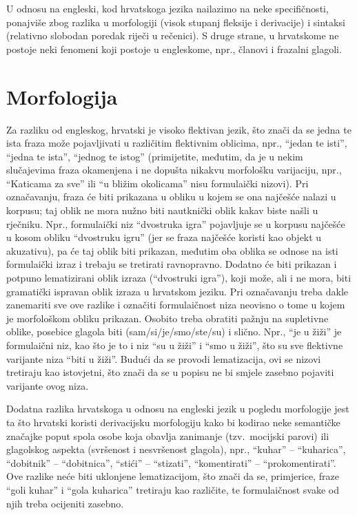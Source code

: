 \documentclass[12pt]{article}
\begin{document}
U odnosu na engleski, kod hrvatskoga jezika nailazimo na neke specifičnosti, ponajviše zbog razlika u
morfologiji (visok stupanj fleksije i derivacije) i sintaksi (relativno slobodan poredak riječi u rečenici). S
druge strane, u hrvatskome ne postoje neki fenomeni koji postoje u engleskome, npr., članovi i frazalni
glagoli.


\section*{Morfologija}

Za razliku od engleskog, hrvatski je visoko flektivan jezik, što znači da se jedna te ista fraza može
pojavljivati u različitim flektivnim oblicima, npr., ``jedan te isti'', ``jedna te ista'', ``jednog te istog'' (primijetite, međutim, da je u nekim slučajevima fraza okamenjena i ne dopušta nikakvu morfološku
varijaciju, npr., ``Katicama za sve'' ili ``u bližim okolicama'' nisu formulaički nizovi). Pri označavanju, fraza će
biti prikazana u obliku u kojem se ona najčešće nalazi u korpusu; taj oblik ne mora nužno biti nautknički
oblik kakav biste našli u rječniku. Npr., formulaički niz ``dvostruka igra'' pojavljuje se u korpusu najčešće u
kosom obliku  ``dvostruku igru''  (jer se fraza najčešće koristi kao objekt u akuzativu), pa će taj oblik biti
prikazan, međutim oba oblika se odnose na isti formulaički izraz i trebaju se tretirati ravnopravno. Dodatno
će biti prikazan i potpuno lematizirani oblik izraza (``dvostruki igra''), koji može, ali i ne mora, biti
gramatički ispravan oblik izraza u hrvatskom jeziku. Pri označavanju treba dakle zanemariti sve ove razlike
i označiti formulaičnost niza neovisno o tome u kojem je morfološkom obliku prikazan. Osobito treba obratiti
pažnju na supletivne oblike, posebice glagola biti (sam/si/je/smo/ste/su) i slično. Npr.,  ``je u žiži'' je
formulaični niz, kao što je to i niz ``su u žiži'' i ``smo u žiži'', što su sve flektivne varijante niza ``biti u žiži''.
Budući da se provodi lematizacija, ovi se nizovi tretiraju kao istovjetni, što znači da se u popisu ne bi smjele
zasebno pojaviti varijante ovog niza.


Dodatna razlika hrvatskoga u odnosu na engleski jezik u pogledu morfologije jest ta što hrvatski koristi
derivacijsku morfologiju kako bi kodirao neke semantičke značajke poput spola osobe koja obavlja
zanimanje (tzv.~mocijski parovi) ili glagolskog aspekta (svršenost i nesvršenost glagola), npr., ``kuhar'' –
``kuharica'', ``dobitnik'' – ``dobitnica'', ``stići'' – ``stizati'', ``komentirati'' – ``prokomentirati''.  Ove razlike neće biti
uklonjene lematizacijom, što znači da se, primjerice, fraze ``goli kuhar'' i ``gola kuharica'' tretiraju kao
različite, te formulaičnost svake od njih treba ocijeniti zasebno.
\end{document}

